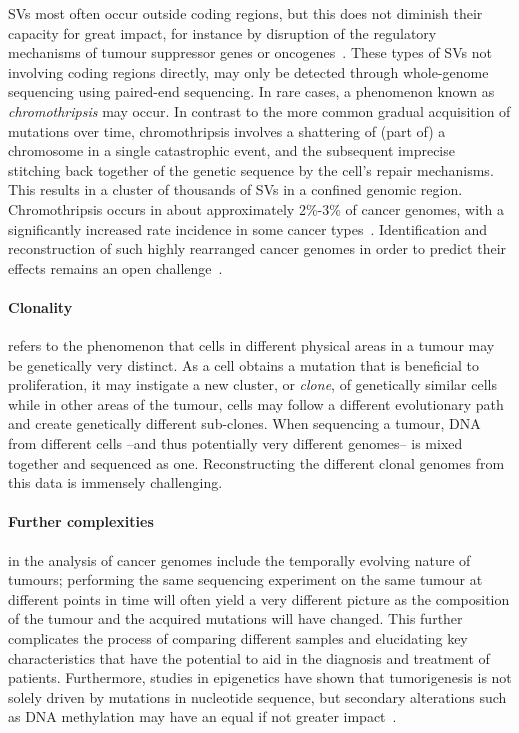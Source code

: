 \begin{justify}
SVs most often occur outside coding regions, but this does not diminish their capacity for great impact, for instance by disruption of the regulatory mechanisms of tumour suppressor genes or oncogenes~\cite{yi2018patterns}. These types of SVs not involving coding regions directly, may only be detected through whole-genome sequencing using paired-end sequencing. In rare cases, a phenomenon known as \emph{chromothripsis} may occur. In contrast to the more common gradual acquisition of mutations over time, chromothripsis involves a shattering of (part of) a chromosome in a single catastrophic event, and the subsequent imprecise stitching back together of the genetic sequence by the cell's repair mechanisms. This results in a cluster of thousands of SVs in a confined genomic region. Chromothripsis occurs in about approximately 2\%-3\% of cancer genomes, with a significantly increased rate incidence in some cancer types~\cite{luijten2018}. Identification and reconstruction of such highly rearranged cancer genomes in order to predict their effects remains an open challenge~\cite{yang2016chromothripsis,govind2014}.




\paragraph{Clonality} refers to the phenomenon that cells in different physical areas in a tumour may be genetically very distinct. As a cell obtains a mutation that is beneficial to proliferation, it may instigate a new cluster, or \textit{clone}, of genetically similar cells while in other areas of the tumour, cells may follow a different evolutionary path and create genetically different sub-clones. When sequencing a tumour, DNA from different cells --and thus potentially very different genomes-- is mixed together and sequenced as one. Reconstructing the different clonal genomes from this data is immensely challenging.

\paragraph{Further complexities} in the analysis of cancer genomes include the temporally evolving nature of tumours; performing the same sequencing experiment on the same tumour at different points in time will often yield a very different picture as the composition of the tumour and the acquired mutations will have changed. This further complicates the process of comparing different samples and elucidating key characteristics that have the potential to aid in the diagnosis and treatment of patients. Furthermore, studies in epigenetics have shown that tumorigenesis is not solely driven by mutations in nucleotide sequence, but secondary alterations such as DNA methylation may have an equal if not greater impact~\cite{pacchierotti2015environmental}.


\end{justify}
